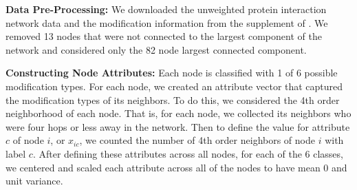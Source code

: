 {\bf Data Pre-Processing: } We downloaded the unweighted protein interaction network data and the modification information from the supplement of \cite{bonacci}. We removed 13 nodes that were not connected to the largest component of the network and considered only the 82 node largest connected component.

{\bf Constructing Node Attributes:}
Each node is classified with 1 of 6 possible modification types. For each node, we created an attribute vector that captured the modification types of its neighbors. To do this, we considered the 4th order neighborhood of each node. That is, for each node, we collected its neighbors who were four hops or less away in the network. Then to define the value for attribute $c$ of node $i$, or $x_{ic}$, we counted the number of 4th order neighbors of node $i$ with label $c$. After defining these attributes across all nodes, for each of the 6 classes, we centered and scaled each attribute across all of the nodes to have mean 0 and unit variance. 

